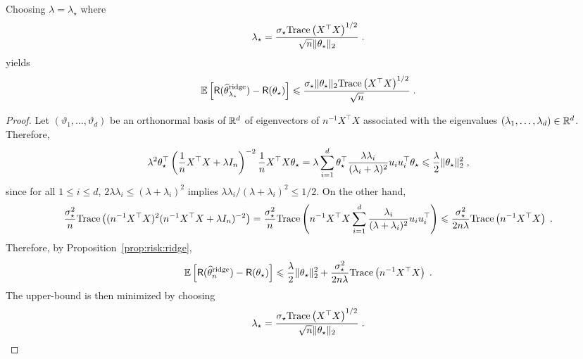 \begin{proposition}
Choosing $\lambda = \lambda_\star$ where 
$$
\lambda_\star = \frac{\sigma_\star \mathrm{Trace}\left(X^\top X\right)^{1/2}}{\sqrt{n}\|\theta_\star\|_2} \;.
$$
yields
$$
\mathbb{E}\left[\mathsf{R}(\widehat {\theta}^{\mathrm{ridge}}_{\lambda_\star}) - \mathsf{R}(\theta_\star)\right]  \leqslant \frac{\sigma_\star \|\theta_\star\|_2 \mathrm{Trace}\left(X^\top X\right)^{1/2}}{\sqrt{n}}  \;.
$$
\end{proposition}
\begin{proof}
Let $(\vartheta_1,\ldots,\vartheta_d)$ be an orthonormal basis of $\mathbb{R}^d$ of eigenvectors of $n^{-1}X^\top X$ associated with the eigenvalues $(\lambda_1,\ldots,\lambda_d)\in\mathbb{R}^d$. Therefore,
$$
 \lambda^2\theta_\star^\top\left(\frac{1}{n}X^\top X + \lambda I_n\right)^{-2} \frac{1}{n}X^\top X \theta_\star = \lambda\sum_{i=1}^d \theta_\star^\top \frac{\lambda \lambda_i}{(\lambda_i + \lambda)^2} u_iu_i^\top \theta_\star \leqslant  \frac{\lambda}{2}\|\theta_\star\|_2^2\;,
$$
since for all $1\leqslant i \leqslant d$, $2\lambda \lambda_i \leqslant (\lambda + \lambda_i)^2$ implies $\lambda \lambda_i/(\lambda + \lambda_i)^2 \leqslant 1/2$. On the other hand,
$$
\frac{\sigma_\star^{2}}{n}\mathrm{Trace}\left((n^{-1}X^\top X)^2(n^{-1}X^\top X + \lambda I_n)^{-2}\right) = \frac{\sigma_\star^{2}}{n}\mathrm{Trace}\left(n^{-1}X^\top X\sum_{i=1}^d\frac{\lambda_i}{(\lambda + \lambda_i)^2}u_iu_i^\top\right) \leqslant \frac{\sigma_\star^{2}}{2n\lambda }\mathrm{Trace}\left(n^{-1}X^\top X\right) \;.
$$
Therefore, by Proposition~\ref{prop:risk:ridge},
$$
\mathbb{E}\left[\mathsf{R}(\widehat {\theta}^{\mathrm{ridge}}_n) - \mathsf{R}(\theta_\star)\right]  \leqslant \frac{\lambda}{2}\|\theta_\star\|_2^2 + \frac{\sigma_\star^{2}}{2n\lambda}\mathrm{Trace}\left(n^{-1}X^\top X\right)\;.
$$
The upper-bound is then minimized by choosing 
$$
\lambda_\star = \frac{\sigma_\star \mathrm{Trace}\left(X^\top X\right)^{1/2}}{\sqrt{n}\|\theta_\star\|_2} \;.
$$
\end{proof}



